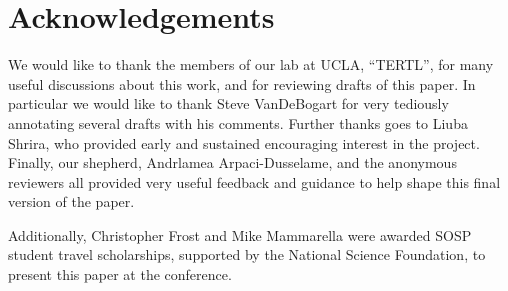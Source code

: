 \section {Acknowledgements}

We would like to thank the members of our lab at UCLA, ``TERTL'', for many
useful discussions about this work, and for reviewing drafts of this paper. In
particular we would like to thank Steve VanDeBogart for very tediously
annotating several drafts with his comments. Further thanks goes to Liuba
Shrira, who provided early and sustained encouraging interest in the project.
Finally, our shepherd, Andrlamea Arpaci-Dusselame, and the anonymous reviewers
all provided very useful feedback and guidance to help shape this final version
of the paper.

Additionally, Christopher Frost and Mike Mammarella were awarded SOSP student
travel scholarships, supported by the National Science Foundation, to present
this paper at the conference.
